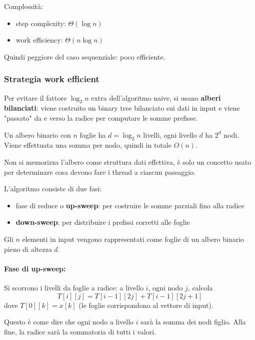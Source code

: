 Complessità: 
\begin{itemize}
    \item step complexity: $\Theta (\log n)$
    \item work efficiency: $\Theta (n \log n)$
\end{itemize}

Quindi peggiore del caso sequenziale: poco efficiente.

\subsubsection{Strategia work efficient}

Per evitare il fattore $\log_2 n$ extra dell'algoritmo naive, si usano \textbf{alberi bilanciati}: viene costruito un binary tree bilanciato sui dati in input e viene "passato" da e verso la radice per computare le somme prefisse.

Un albero binario con $n$ foglie ha $d = \log_2 n$ livelli, ogni livello $d$ ha $2^d$ nodi. Viene effettuata una somma per nodo, quindi in totale $O(n)$.

Non si memorizza l'albero come struttura dati effettiva, è solo un concetto usato per determinare cosa devono fare i thread a ciascun passaggio. 

L'algoritmo consiste di due fasi:
\begin{itemize}
    \item fase di reduce o \textbf{up-sweep}: per costruire le somme parziali fino alla radice
    
    \item \textbf{down-sweep}: per distribuire i prefissi corretti alle foglie
\end{itemize}

Gli $n$ elementi in input vengono rappresentati come foglie di un albero binario pieno di altezza $d$.

\paragraph{Fase di up-sweep:} Si scorrono i livelli da foglie a radice: a livello $i$, ogni nodo $j$, calcola
$$ T[i][j] = T[i-1][2j] + T[i-1][2j + 1] $$
dove $T[0][k] = x[k]$ (le foglie corrispondono al vettore di input). 

Questo è come dire che ogni nodo a livello $i$ sarà la somma dei nodi figlio. Alla fine, la radice sarà la sommatoria di tutti i valori.

\begin{center}
    
\end{center}

